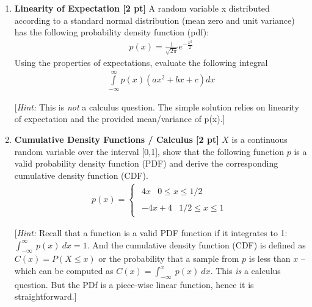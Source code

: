 \documentclass{article}
\begin{document}
\begin{enumerate}
\begin{enumerate}
\item (2pts) If both tosses are heads, what is the probability that the third coin toss will be head? (you should build on results of b)\\
\end{enumerate}

\item \textbf{Linearity of Expectation [2 pt]} A random variable x distributed according to a standard normal distribution (mean zero and unit variance)
has the following probability density function (pdf):
%
\begin{align*}
p(x) = \frac{1}{{\sqrt {2\pi } }}{e^{ - \frac{{{x^2}}}{2}}}
\end{align*}
%
Using the properties of expectations, evaluate the following integral
%
\begin{align*}
\int\limits_{ - \infty }^\infty  {p(x)(a{x^2} + b{x} + c)dx}
\end{align*}

[\emph{Hint:} This is \emph{not} a calculus question. The simple solution relies on linearity of expectation and the provided mean/variance of p(x).]



\item \textbf{Cumulative Density Functions / Calculus [2 pt]}
$X$ is a continuous random variable over the interval [0,1], show that the following function $p$ is a valid probability density function (PDF) and derive the corresponding cumulative density function (CDF). %
\begin{align*}
p(x) = \left\{ {\begin{array}{*{20}{c}}
{\begin{array}{*{20}{c}}
{4x}&{0 \le x \le 1/2}
\end{array}}\\
{\begin{array}{*{20}{c}}
{ - 4x + 4}&{1/2 \le x \le 1}
\end{array}}
\end{array}} \right.
\label{eq:pdf}
\end{align*}
%

[\emph{Hint:} Recall that a function is a valid PDF function if it integrates to 1: $\int_{-\infty}^{\infty}~p(x)~dx=1$. And the cumulative density function (CDF) is defined as $C(x) = P(X \le x)$ or the probability that a sample from $p$ is less than $x$ -- which can be computed as $C(x) = \int_{-\infty}^x~p(x)~dx$.  This \emph{is} a calculus question. But the PDf is a piece-wise linear function, hence it is straightforward.]



\end{enumerate}
\end{document}
